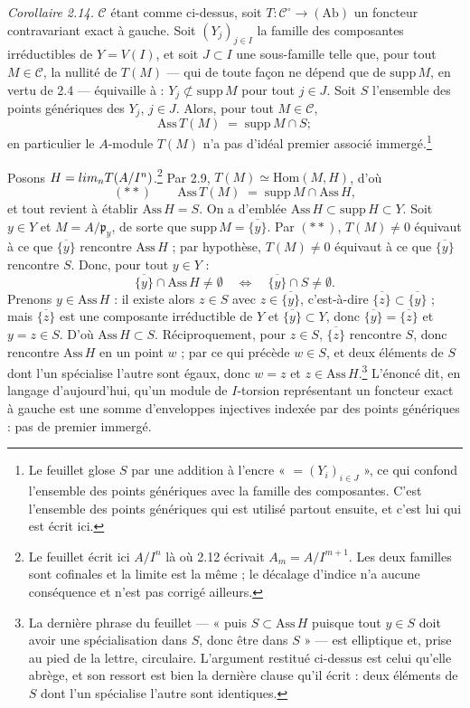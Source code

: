 \documentclass[11pt,a4paper]{article}
\begin{document}
\emph{Corollaire 2.14.} $\mathcal{C}$ étant comme ci-dessus, soit
$T : \mathcal{C}^{\circ} \to (\mathrm{Ab})$ un foncteur contravariant exact à
gauche. Soit $(Y_{j})_{j \in I}$ la famille des composantes irréductibles de
$Y = V(I)$, et soit $J \subset I$ une sous-famille telle que, pour tout
$M \in \mathcal{C}$, la nullité de $T(M)$ — qui de toute façon ne dépend que de
$\mathrm{supp}\, M$, en vertu de 2.4 — équivaille à : $Y_{j} \not\subset
\mathrm{supp}\, M$ pour tout $j \in J$. Soit $S$ l'ensemble des points
génériques des $Y_{j}$, $j \in J$. Alors, pour tout $M \in \mathcal{C}$,
\[
  \mathrm{Ass}\, T(M) \;=\; \mathrm{supp}\, M \cap S ;
\]
en particulier le $A$-module $T(M)$ n'a pas d'idéal premier associé
immergé.\footnote{Le feuillet glose $S$ par une addition à l'encre
« $= (Y_{i})_{i \in J}$ », ce qui confond l'ensemble des points génériques avec
la famille des composantes. C'est l'ensemble des points génériques qui est
utilisé partout ensuite, et c'est lui qui est écrit ici.}

Posons $H = \varinjlim_{n} T(A/I^{n})$.\footnote{Le feuillet écrit ici $A/I^{n}$
là où 2.12 écrivait $A_{m} = A/I^{m+1}$. Les deux familles sont cofinales et la
limite est la même ; le décalage d'indice n'a aucune conséquence et n'est pas
corrigé ailleurs.} Par 2.9, $T(M) \simeq \mathrm{Hom}(M,H)$, d'où
\[
  (\ast\ast) \qquad
  \mathrm{Ass}\, T(M) \;=\; \mathrm{supp}\, M \cap \mathrm{Ass}\, H ,
\]
et tout revient à établir $\mathrm{Ass}\, H = S$. On a d'emblée
$\mathrm{Ass}\, H \subset \mathrm{supp}\, H \subset Y$. Soit $y \in Y$ et
$M = A/\mathfrak{p}_{y}$, de sorte que $\mathrm{supp}\, M = \overline{\{y\}}$.
Par $(\ast\ast)$, $T(M) \neq 0$ équivaut à ce que $\overline{\{y\}}$ rencontre
$\mathrm{Ass}\, H$ ; par hypothèse, $T(M) \neq 0$ équivaut à ce que
$\overline{\{y\}}$ rencontre $S$. Donc, pour tout $y \in Y$ :
\[
  \overline{\{y\}} \cap \mathrm{Ass}\, H \neq \emptyset
  \quad\Longleftrightarrow\quad
  \overline{\{y\}} \cap S \neq \emptyset .
\]
Prenons $y \in \mathrm{Ass}\, H$ : il existe alors $z \in S$ avec $z \in
\overline{\{y\}}$, c'est-à-dire $\overline{\{z\}} \subset \overline{\{y\}}$ ;
mais $\overline{\{z\}}$ est une composante irréductible de $Y$ et
$\overline{\{y\}} \subset Y$, donc $\overline{\{y\}} = \overline{\{z\}}$ et
$y = z \in S$. D'où $\mathrm{Ass}\, H \subset S$. Réciproquement, pour $z \in S$,
$\overline{\{z\}}$ rencontre $S$, donc rencontre $\mathrm{Ass}\, H$ en un point
$w$ ; par ce qui précède $w \in S$, et deux éléments de $S$ dont l'un spécialise
l'autre sont égaux, donc $w = z$ et $z \in \mathrm{Ass}\, H$.\footnote{La
dernière phrase du feuillet — « puis $S \subset \mathrm{Ass}\, H$ puisque tout
$y \in S$ doit avoir une spécialisation dans $S$, donc être dans $S$ » — est
elliptique et, prise au pied de la lettre, circulaire. L'argument restitué
ci-dessus est celui qu'elle abrège, et son ressort est bien la dernière clause
qu'il écrit : deux éléments de $S$ dont l'un spécialise l'autre sont
identiques.} L'énoncé dit, en langage d'aujourd'hui, qu'un module de
$I$-torsion représentant un foncteur exact à gauche est une somme d'enveloppes
injectives indexée par des points génériques : pas de premier immergé.
\end{document}
